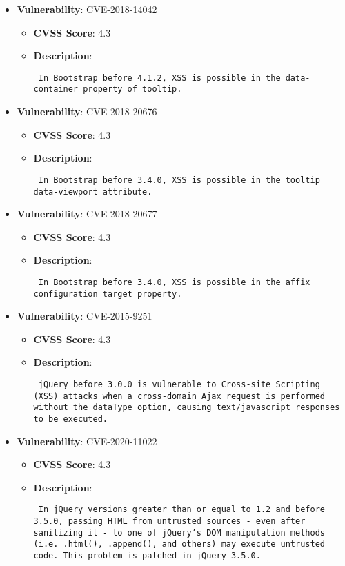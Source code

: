 \documentclass{article}
\begin{document}
\begin{itemize}
        \item \textbf{Vulnerability}: CVE-2018-14042
        \begin{itemize}
            \item \textbf{CVSS Score}:  4.3 
            \item \textbf{Description}: \parbox{\linewidth}{\texttt{ In Bootstrap before 4.1.2, XSS is possible in the data-container property of tooltip. }}
        \end{itemize}
    
        \item \textbf{Vulnerability}: CVE-2018-20676
        \begin{itemize}
            \item \textbf{CVSS Score}:  4.3 
            \item \textbf{Description}: \parbox{\linewidth}{\texttt{ In Bootstrap before 3.4.0, XSS is possible in the tooltip data-viewport attribute. }}
        \end{itemize}
    
        \item \textbf{Vulnerability}: CVE-2018-20677
        \begin{itemize}
            \item \textbf{CVSS Score}:  4.3 
            \item \textbf{Description}: \parbox{\linewidth}{\texttt{ In Bootstrap before 3.4.0, XSS is possible in the affix configuration target property. }}
        \end{itemize}
    
        \item \textbf{Vulnerability}: CVE-2015-9251
        \begin{itemize}
            \item \textbf{CVSS Score}:  4.3 
            \item \textbf{Description}: \parbox{\linewidth}{\texttt{ jQuery before 3.0.0 is vulnerable to Cross-site Scripting (XSS) attacks when a cross-domain Ajax request is performed without the dataType option, causing text/javascript responses to be executed. }}
        \end{itemize}
    
        \item \textbf{Vulnerability}: CVE-2020-11022
        \begin{itemize}
            \item \textbf{CVSS Score}:  4.3 
            \item \textbf{Description}: \parbox{\linewidth}{\texttt{ In jQuery versions greater than or equal to 1.2 and before 3.5.0, passing HTML from untrusted sources - even after sanitizing it - to one of jQuery's DOM manipulation methods (i.e. .html(), .append(), and others) may execute untrusted code. This problem is patched in jQuery 3.5.0. }}
        \end{itemize}
    

\end{itemize}
\end{document}
